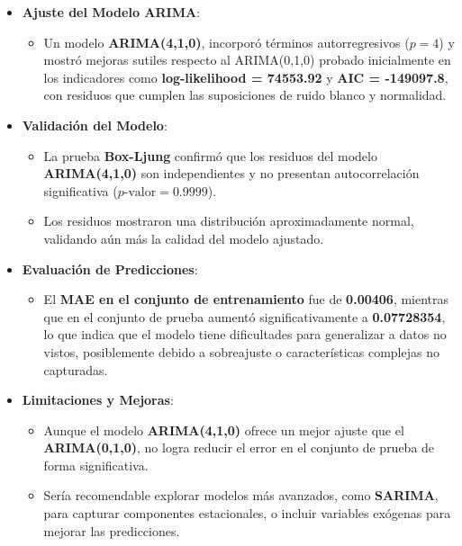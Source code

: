 \documentclass[
]{book}
\providecommand{\tightlist}{%
  \setlength{\itemsep}{0pt}\setlength{\parskip}{0pt}}
\begin{document}
\begin{itemize}
\tightlist
\item
  \textbf{Ajuste del Modelo ARIMA}:

  \begin{itemize}
  \tightlist
  \item
    Un modelo \textbf{ARIMA(4,1,0)}, incorporó términos autorregresivos (\(p = 4\)) y mostró mejoras sutiles respecto al ARIMA(0,1,0) probado inicialmente en los indicadores como \textbf{log-likelihood = 74553.92} y \textbf{AIC = -149097.8}, con residuos que cumplen las suposiciones de ruido blanco y normalidad.
  \end{itemize}
\item
  \textbf{Validación del Modelo}:

  \begin{itemize}
  \tightlist
  \item
    La prueba \textbf{Box-Ljung} confirmó que los residuos del modelo \textbf{ARIMA(4,1,0)} son independientes y no presentan autocorrelación significativa (\(p\text{-valor} = 0.9999\)).
  \item
    Los residuos mostraron una distribución aproximadamente normal, validando aún más la calidad del modelo ajustado.
  \end{itemize}
\item
  \textbf{Evaluación de Predicciones}:

  \begin{itemize}
  \tightlist
  \item
    El \textbf{MAE en el conjunto de entrenamiento} fue de \textbf{0.00406}, mientras que en el conjunto de prueba aumentó significativamente a \textbf{0.07728354}, lo que indica que el modelo tiene dificultades para generalizar a datos no vistos, posiblemente debido a sobreajuste o características complejas no capturadas.
  \end{itemize}
\item
  \textbf{Limitaciones y Mejoras}:

  \begin{itemize}
  \tightlist
  \item
    Aunque el modelo \textbf{ARIMA(4,1,0)} ofrece un mejor ajuste que el \textbf{ARIMA(0,1,0)}, no logra reducir el error en el conjunto de prueba de forma significativa.
  \item
    Sería recomendable explorar modelos más avanzados, como \textbf{SARIMA}, para capturar componentes estacionales, o incluir variables exógenas para mejorar las predicciones.
  \end{itemize}
\end{itemize}
\end{document}
